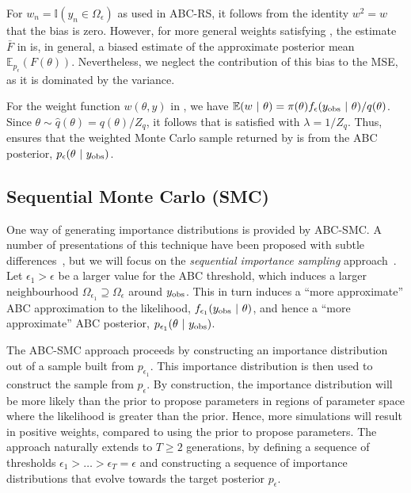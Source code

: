 \documentclass[review]{siamonline190516}
\begin{document}
\begin{note}
For $w_n = \mathbb I(y_n \in \Omega_\epsilon)$ as used in ABC-RS, it follows from the identity $w^2 = w$ that the bias is zero.
However, for more general weights satisfying , the estimate $\bar F$ in  is, in general, a biased estimate of the approximate posterior mean $\mathbb E_{p_\epsilon}(F(\theta))$.
Nevertheless, we neglect the contribution of this bias to the MSE, as it is dominated by the variance.
\end{note}

For the weight function $w(\theta, y)$ in , we have $\mathbb E(w~|~\theta) = \pi(\theta) f_\epsilon(y_{\mathrm{obs}}~|~\theta) / q(\theta)$.
Since $\theta \sim \hat q(\theta) = q(\theta)/Z_q$, it follows that  is satisfied with $\lambda = 1/Z_q$.
Thus,  ensures that the weighted Monte Carlo sample returned by  is from the ABC posterior, $p_\epsilon(\theta~|~y_{\mathrm{obs}})$.

\subsection{Sequential Monte Carlo (SMC)}
\label{s:SMC}

One way of generating importance distributions is provided by ABC-SMC.
A number of presentations of this technique have been proposed with subtle differences~\cite{Beaumont2009,DelMoral2006,Sisson2007}, but we will focus on the \emph{sequential importance sampling} approach~\cite{Toni2009}. 
Let $\epsilon_1 > \epsilon$ be a larger value for the ABC threshold, which induces a larger neighbourhood $\Omega_{\epsilon_1} \supseteq \Omega_\epsilon$ around $y_{\mathrm{obs}}$.
This in turn induces a ``more approximate'' ABC approximation to the likelihood, $f_{\epsilon_1}(y_{\mathrm{obs}}~|~\theta)$, and hence a ``more approximate'' ABC posterior, $p_{\epsilon_1}(\theta~|~y_{\mathrm{obs}})$.

The ABC-SMC approach proceeds by constructing an importance distribution out of a sample built from $p_{\epsilon_1}$.
This importance distribution is then used to construct the sample from $p_\epsilon$.
By construction, the importance distribution will be more likely than the prior to propose parameters in regions of parameter space where the likelihood is greater than the prior.
Hence, more simulations will result in positive weights, compared to using the prior to propose parameters.
The approach naturally extends to $T \geq 2$ generations, by defining a sequence of thresholds $\epsilon_1 > \dots > \epsilon_T = \epsilon$ and constructing a sequence of importance distributions that evolve towards the target posterior $p_\epsilon$.
\end{document}
